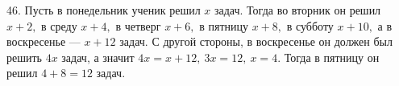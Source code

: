 46. Пусть в понедельник ученик решил $x$ задач. Тогда во вторник он решил $x+2,$ в среду $x+4,$ в четверг $x+6,$ в пятницу $x+8,$ в субботу $x+10,$ а в воскресенье --- $x+12$ задач. С другой стороны, в воскресенье он должен был решить $4x$ задач, а значит $4x=x+12,\ 3x=12,\ x=4.$ Тогда в пятницу он решил $4+8=12$ задач.\\
